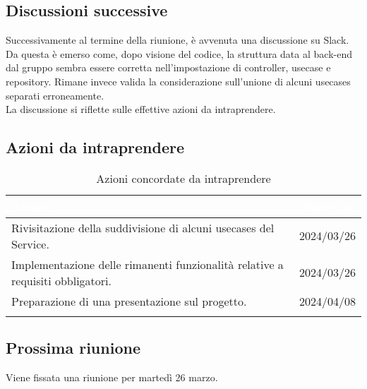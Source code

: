 \subsection{Discussioni successive}
Successivamente al termine della riunione, è avvenuta una discussione su Slack. Da questa è emerso come, dopo visione del codice, la struttura data al back-end dal gruppo sembra essere corretta nell'impostazione di controller, usecase e repository. Rimane invece valida la considerazione sull'unione di alcuni usecases separati erroneamente.\\
La discussione si riflette sulle effettive azioni da intraprendere.

\subsection{Azioni da intraprendere} \label{subsec:action}

{
\setlength{\tabcolsep}{10pt}
\renewcommand{\arraystretch}{1.5}
\begin{xltabular}{\textwidth}{| X | c |}
    \hline
     \textbf{\textcolor{white}{Azione}} & \textbf{\textcolor{white}{Scadenza}} \\
    \hline
    \endhead
   Rivisitazione della suddivisione di alcuni usecases del Service. & 2024/03/26\\
    \hline
    Implementazione delle rimanenti funzionalità relative a requisiti obbligatori. & 2024/03/26\\
    \hline
    Preparazione di una presentazione sul progetto. & 2024/04/08\\
    \hline
     \caption{Azioni concordate da intraprendere}
    \label{tab:reqimp}
\end{xltabular}
}

\subsection{Prossima riunione} \label{subsec:riunione}
Viene fissata una riunione per martedì 26 marzo.
\newpage    
